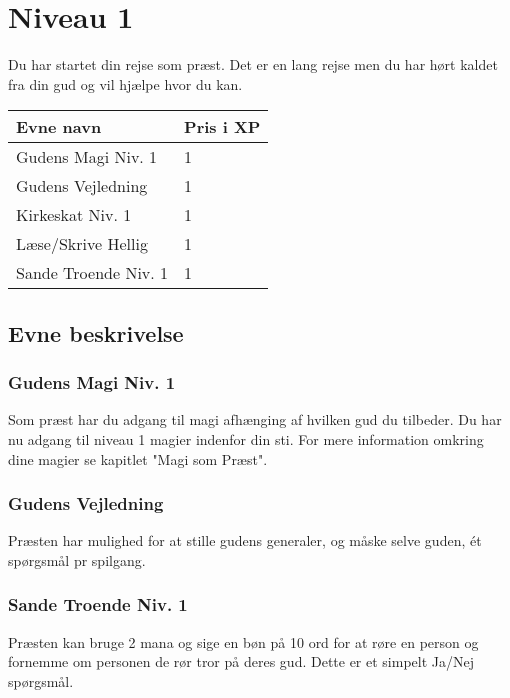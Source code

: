 \chapter{Niveau 1}
Du har startet din rejse som præst. Det er en lang rejse men du har hørt kaldet fra din gud og vil hjælpe hvor du kan.

\begin{table}[H]
    \centering
    \begin{tabular}{|p{}|p{}|}
    \rowcolor{cerulean!80}\hline
        Evne navn & Pris i XP \\\hline
            Gudens Magi Niv. 1 & 1 \\\hline
            Gudens Vejledning & 1 \\\hline
            Kirkeskat Niv. 1 & 1 \\\hline
            Læse/Skrive Hellig & 1 \\\hline
            Sande Troende Niv. 1& 1 \\\hline
    \end{tabular}
\end{table}

\section{Evne beskrivelse}


\subsection{Gudens Magi Niv. 1}
Som præst har du adgang til magi afhænging af hvilken gud du tilbeder. Du har nu adgang til niveau 1 magier indenfor din sti. For mere information omkring dine magier se kapitlet "Magi som Præst".

\subsection{Gudens Vejledning}
Præsten har mulighed for at stille gudens generaler, og måske selve guden, ét spørgsmål pr spilgang.





\subsection{Sande Troende Niv. 1}
Præsten kan bruge 2 mana og sige en bøn på 10 ord for at røre en person og fornemme om personen de rør tror på deres gud. Dette er et simpelt Ja/Nej spørgsmål. 